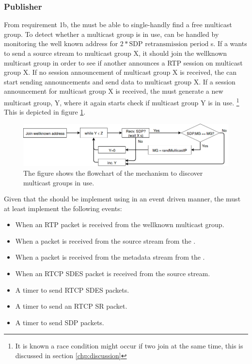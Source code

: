 \subsubsection{Publisher} \label{sec:design:publisher}
From requirement 1b, the \pub{} must be able to single-handly find a free multicast group. To detect whether a multicast group is in use, can be handled by monitoring the well known address for $2*\text{SDP retransmission period}$ s. If a  wants to send a source stream to multicast group X, it should join the wellknown multicast group in order to see if another  announces a RTP session on multicast group X. If no session announcement of multicast group X is received, the  can start sending announcements and send data to multicast group X. If a session announcement for multicast group X is received, the  must generate a new multicast group, Y, where it again starts check if multicast group Y is in use. \footnote{It is known a race condition might occur if two \pubs{} join at the same time, this is discussed in section \ref{chp:discussion}} This is depicted in figure \ref{fig:design:pubsub:inuse}.

\begin{figure}[H]
	\centering
	\includegraphics[width=\textwidth]{figures/flowchart-publisher-mg}
	\caption{The figure shows the flowchart of the mechanism to discover multicast groups in use.} \label{fig:design:pubsub:inuse}
\end{figure}


Given that the \pub{} should be implement using in an event driven manner, the \pub{} must at least implement the following events:


\begin{itemize}
	\item When an RTP packet is received from the wellknown multicast group.
	\item When a packet is received from the source stream from the \con{}.
	\item When a packet is received from the metadata stream from the \pro{}.
	\item When an RTCP SDES packet is received from the source stream.
	\item A timer to send RTCP SDES packets.
	\item A timer to send an RTCP SR packet.
	\item A timer to send SDP packets.
\end{itemize}


